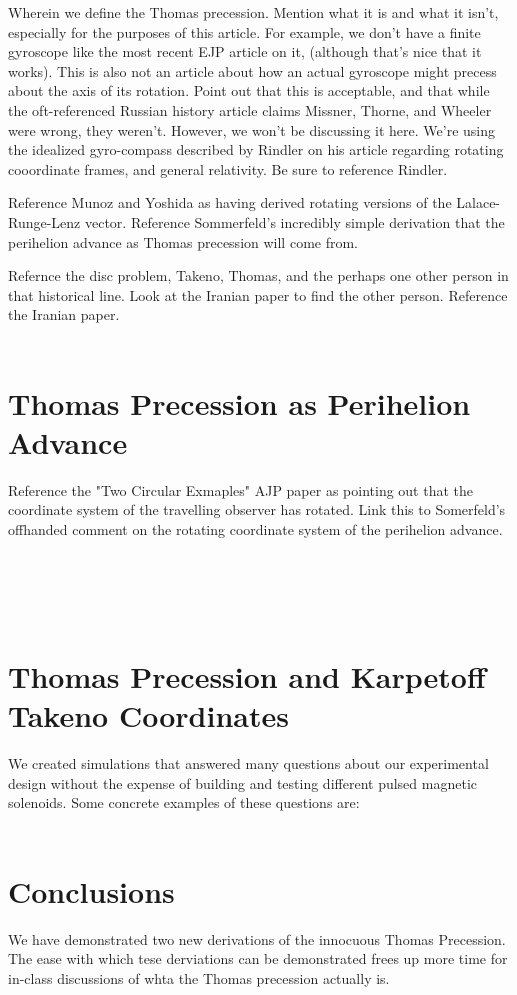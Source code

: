 \documentclass[prb,preprint]{revtex4-1}
\begin{document}
Wherein we define the Thomas precession.  Mention what it is and what it isn't, especially for the purposes of this article.  For example, we don't have a finite gyroscope like the most recent EJP article on it, (although that's nice that it works).  This is also not an article about how an actual gyroscope might precess about the axis of its rotation.  Point out that this is acceptable, and that while the oft-referenced Russian history article claims Missner, Thorne, and Wheeler were wrong, they weren't.  However, we won't be discussing it here.  We're using the idealized gyro-compass described by Rindler on his article regarding rotating cooordinate frames, and general relativity.  Be sure to reference Rindler.

Reference Munoz and Yoshida as having derived rotating versions of the Lalace-Runge-Lenz vector.  Reference Sommerfeld's incredibly simple derivation that the perihelion advance as Thomas precession will come from.  

Refernce the disc problem, Takeno, Thomas, and the perhaps one other person in that historical line.  Look at the Iranian paper to find the other person.  Reference the Iranian paper.
\\
\\
\section{Thomas Precession as Perihelion Advance}
Reference the "Two Circular Exmaples" AJP paper as pointing out that the coordinate system of the travelling observer has rotated.  Link this to Somerfeld's offhanded comment on the rotating coordinate system of the perihelion advance.
\\
\\
\\\\\\
\section{Thomas Precession and Karpetoff Takeno Coordinates}
We created simulations that answered many questions about our experimental design without the expense of building and testing different pulsed magnetic solenoids.  Some concrete examples of these questions are: 
\\
\\
\section{Conclusions}
We have demonstrated two new derivations of the innocuous Thomas Precession.  The ease with which tese derviations can be demonstrated frees up more time for in-class discussions of whta the Thomas precession actually is.
\end{document}
